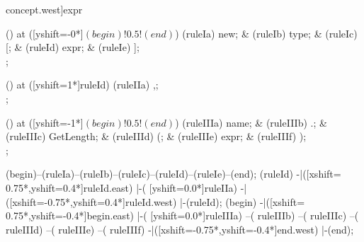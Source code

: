 \begin{syntax}[[xshift=22mm]concept.west]{expr}
  
  \node[sequence,column sep=1.5cm] () at ([yshift=-0*\syntaxruledist]$(begin)!0.5!(end)$) {
    \node[terminal]       (ruleIa) {new};
    &
    \node[nonterminal]    (ruleIb) {type};
    &
    \node[terminal]       (ruleIc) {[};
    &
    \node[nonterminal]    (ruleId) {expr};
    &
    \node[terminal]       (ruleIe) {]};
    \\
  };
  
  \node[sequence,column sep=1.0cm] () at ([yshift=1*\syntaxruledist]ruleId) {
    \node[terminal]    (ruleIIa) {,};
    \\
  };
  
  \node[sequence,column sep=0.8cm] () at ([yshift=-1*\syntaxruledist]$(begin)!0.5!(end)$) {
    \node[nonterminal] (ruleIIIa) {name};
    &
    \node[terminal]    (ruleIIIb) {.};
    &
    \node[terminal]    (ruleIIIc) {GetLength};
    &
    \node[terminal]    (ruleIIId) {(};
    &
    \node[nonterminal] (ruleIIIe) {expr};
    &
    \node[terminal]    (ruleIIIf) {)};
    \\
  };
  
  \draw[path] (begin)--(ruleIa)--(ruleIb)--(ruleIc)--(ruleId)--(ruleIe)--(end);
  \draw[path] (ruleId)
            -|([xshift= 0.75*\syntaxruledist,yshift=0.4*\syntaxruledist]ruleId.east)
            |-(                            [yshift=0.0*\syntaxruledist]ruleIIa)
            -|([xshift=-0.75*\syntaxruledist,yshift=0.4*\syntaxruledist]ruleId.west)
            |-(ruleId);
  \draw[path] (begin)
            -|([xshift= 0.75*\syntaxruledist,yshift=-0.4*\syntaxruledist]begin.east)
            |-(                             [yshift=0.0*\syntaxruledist]ruleIIIa)
            --(                                                         ruleIIIb)
            --(                                                         ruleIIIc)
            --(                                                         ruleIIId)
            --(                                                         ruleIIIe)
            --(                                                         ruleIIIf)
            -|([xshift=-0.75*\syntaxruledist,yshift=-0.4*\syntaxruledist]end.west)
            |-(end);
\end{syntax}

